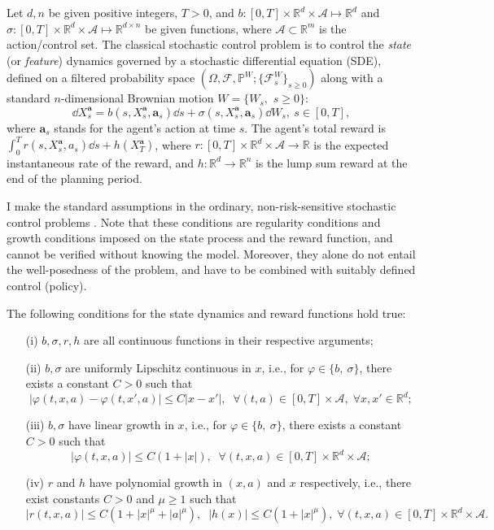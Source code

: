 Let $d,n$ be given positive integers, $T>0$, and $b: [0,T]\times \mathbb{R}^d\times \mathcal{A} \mapsto \mathbb{R}^d$ and $\sigma:
[0,T]\times \mathbb{R}^d\times \mathcal{A}\mapsto \mathbb{R}^{d\times n}$ be given functions, where $\mathcal{A}\subset\mathbb{R}^m$ is the action/control set. The classical stochastic control problem is to control the {\it state} (or {\it feature}) dynamics governed by  a stochastic differential equation (SDE), defined on a filtered probability space $\left( \Omega ,\mathcal{F},\mathbb{P}^W; \{\mathcal{F}_s^W\}_{s\geq0}\right) $ along with a standard  $n$-dimensional Brownian motion  $W=\{W_{s},$ $s\geq 0\}$:
\begin{equation}
	\label{eq:model classical}
	\dd X_s^{\bm{a}} = b(s,X_s^{\bm{a}},\bm a_s)\dd s + \sigma(s,X_s^{\bm{a}},\bm a_s) \dd W_s,\
	s\in [0,T],\end{equation}
where $\bm a_s$ stands for the agent's action at time $s$. The agent's total reward is $\int_0^T r(s, X_s^{\bm a}, a_s)\dd s + h(X_T^{\bm a})$, where $r:[0,T]\times \mathbb{R}^d \times \mathcal{A} \to \mathbb{R}$ is the expected instantaneous rate of the reward, and $h: \mathbb{R}^d \to \mathbb{R}^n$ is the lump sum reward at the end of the planning period.


I make the standard assumptions in the ordinary, non-risk-sensitive stochastic control problems \citep{YZbook}. Note that these conditions are regularity conditions and growth conditions imposed on the state process and the reward function, and cannot be verified without knowing the model. Moreover, they alone do not entail the well-posedness of the problem, and have to be combined with suitably defined control (policy). 
\begin{assumption}
	\label{ass:dynamic}
	The following conditions for the state dynamics and reward functions hold true:
	
	\begin{enumerate}
		\item[(i)] $b,\sigma,r,h$ are all continuous functions in their respective arguments;
		\item[(ii)] $b,\sigma$ are uniformly Lipschitz continuous in $x$, i.e., for $\varphi \in\{ b,\ \sigma\}$, there exists a constant $C>0$ such that
		\[ |\varphi(t,x,a) - \varphi(t,x',a)| \leq C|x-x'|,\;\;\forall (t,a)\in [0,T] \times \mathcal{A},\;\forall x,x'\in \mathbb{R}^d; \]
		\item[(iii)] $b,\sigma$ have linear growth in $x$, i.e., for $\varphi \in\{ b,\ \sigma\}$, there exists a constant $C>0$ such that
		\[|\varphi(t,x,a)| \leq C(1+|x|) ,\;\;\forall (t,x,a)\in [0,T] \times \mathbb{R}^d\times \mathcal{A};\]
		\item[(iv)] $r$ and $h$ have polynomial growth  in $(x,a)$ and $x$ respectively,  i.e., 		there exist constants $C>0$ and $\mu\geq 1$ such that
		\[
		|r(t,x,a)| \leq C(1+|x|^{\mu} + |a|^{\mu}) ,\;\;|h(x)| \leq C(1+|x|^{\mu}),\; \forall (t,x,a)\in [0,T] \times \mathbb{R}^d \times \mathcal{A}.\]
	\end{enumerate}
\end{assumption}


